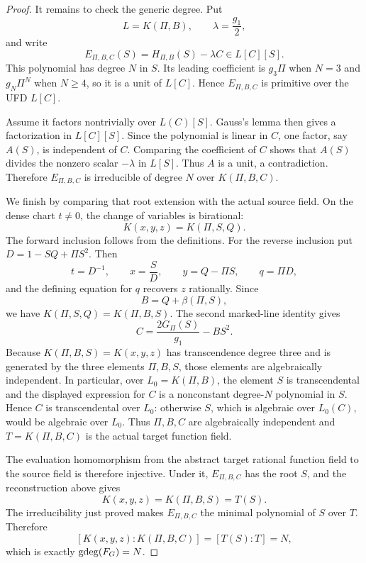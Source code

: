 \begin{proof}
It remains to check the generic degree.  Put
\[
 L=K(\Pi,B),\qquad \lambda=\frac{g_1}{2},
\]
and write
\[
 E_{\Pi,B,C}(S)=H_{\Pi,B}(S)-\lambda C\in L[C][S].
\]
This polynomial has degree $N$ in $S$.  Its leading coefficient is $g_3\Pi$
when $N=3$ and $g_N\Pi^N$ when $N\geq4$, so it is a unit of $L[C]$.  Hence
$E_{\Pi,B,C}$ is primitive over the UFD $L[C]$.

Assume it factors nontrivially over $L(C)[S]$.  Gauss's lemma then gives a
factorization in $L[C][S]$.  Since the polynomial is linear in $C$, one factor,
say $A(S)$, is independent of $C$.  Comparing the coefficient of $C$ shows
that $A(S)$ divides the nonzero scalar $-\lambda$ in $L[S]$.  Thus $A$ is a
unit, a contradiction.  Therefore $E_{\Pi,B,C}$ is irreducible of degree $N$
over $K(\Pi,B,C)$.

We finish by comparing that root extension with the actual source field.
On the dense chart \(t\neq0\), the change of variables is birational:
\[
 K(x,y,z)=K(\Pi,S,Q).
\]
The forward inclusion follows from the definitions.  For the reverse
inclusion put \(D=1-SQ+\Pi S^2\).  Then
\begin{equation}
 t=D^{-1},\qquad x=\frac{S}{D},\qquad
 y=Q-\Pi S,\qquad q=\Pi D,
 \label{eq:function-field-reconstruction}
\end{equation}
and the defining equation for \(q\) recovers \(z\) rationally.  Since
\[
 B=Q+\beta(\Pi,S),
\]
we have \(K(\Pi,S,Q)=K(\Pi,B,S)\).  The second marked-line identity gives
\[
 C=\frac{2G_\Pi(S)}{g_1}-BS^2.
\]
Because \(K(\Pi,B,S)=K(x,y,z)\) has transcendence degree three and is
generated by the three elements \(\Pi,B,S\), those elements are algebraically
independent.  In particular, over \(L_0=K(\Pi,B)\), the element \(S\) is
transcendental and the displayed expression for \(C\) is a nonconstant
degree-\(N\) polynomial in \(S\).  Hence \(C\) is transcendental over \(L_0\):
otherwise \(S\), which is algebraic over \(L_0(C)\), would be algebraic over
\(L_0\).  Thus \(\Pi,B,C\) are algebraically independent and
\(T=K(\Pi,B,C)\) is the actual target function field.

The evaluation homomorphism from the abstract target rational function field
to the source field is therefore injective.  Under it,
\(E_{\Pi,B,C}\) has the root \(S\), and the reconstruction above gives
\[
 K(x,y,z)=K(\Pi,B,S)=T(S).
\]
The irreducibility just proved makes \(E_{\Pi,B,C}\) the minimal polynomial
of \(S\) over \(T\).  Therefore
\[
 [K(x,y,z):K(\Pi,B,C)]=[T(S):T]=N,
\]
which is exactly \(\operatorname{gdeg}(F_G)=N\).
\end{proof}

